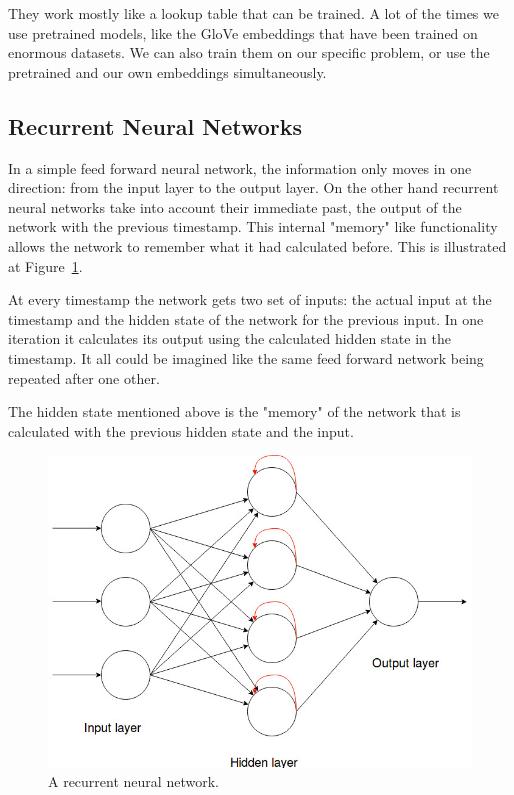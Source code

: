 They work mostly like a lookup table that can be trained. A lot of the times we use pretrained models, like the GloVe embeddings that have been trained on enormous datasets. We can also train them on our specific problem, or use the pretrained and our own embeddings simultaneously.
\FloatBarrier

\subsection{Recurrent Neural Networks}

In a simple feed forward neural network, the information only moves in one direction: from the input layer to the output layer. On the other hand recurrent neural networks take into account their immediate past, the output of the network with the previous timestamp. This internal "memory" like functionality allows the network to remember what it had calculated before. This is illustrated at Figure~\ref{fig:recurrent_net}.

At every timestamp the network gets two set of inputs: the actual input at the timestamp and the hidden state of the network for the previous input. In one iteration it calculates its output using the calculated hidden state in the timestamp. It all could be imagined like the same feed forward network being repeated after one other.

The hidden state mentioned above is the "memory" of the network that is calculated with the previous hidden state and the input.

\begin{figure}[!htb]
	\centering
	\includegraphics[scale=0.5]{recurrent_neural_network.jpg}
	\caption{A recurrent neural network.}
	\label{fig:recurrent_net}
\end{figure}

